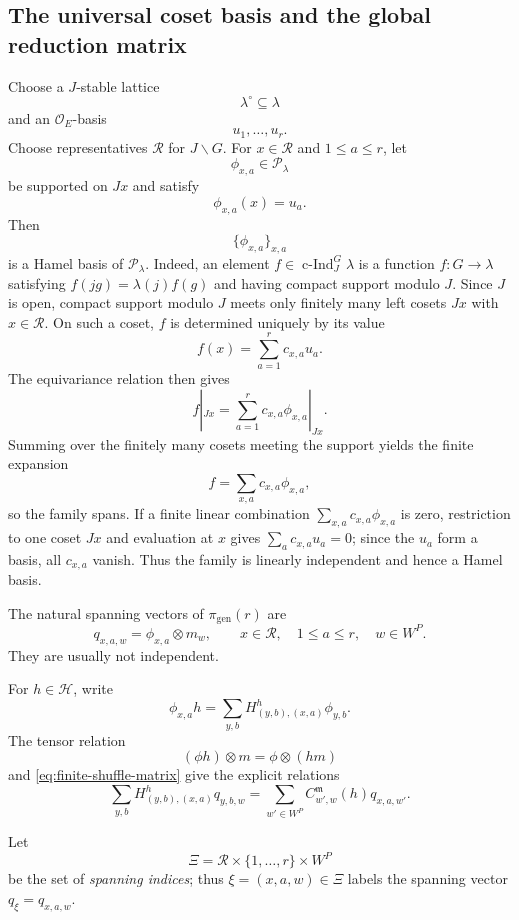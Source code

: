 \documentclass[12pt]{article}
\theoremstyle{definition}
\theoremstyle{remark}
\newcommand{\Ocoeff}{\mathcal O_E}
\newcommand{\cInd}{\operatorname{c\text{-}Ind}}
\begin{document}
\subsection{The universal coset basis and the global reduction matrix}

Choose a \(J\)-stable lattice
\[
 \lambda^\circ\subseteq\lambda
\]
and an \(\Ocoeff\)-basis
\[
 u_1,\ldots,u_r.
\]
Choose representatives \(\mathscr R\) for \(J\backslash G\).  For
\(x\in\mathscr R\) and \(1\leq a\leq r\), let
\[
 \phi_{x,a}\in\mathcal P_\lambda
\]
be supported on \(Jx\) and satisfy
\[
 \phi_{x,a}(x)=u_a.
\]
Then
\[
 \{\phi_{x,a}\}_{x,a}
\]
is a Hamel basis of \(\mathcal P_\lambda\).
Indeed, an element $f\in\cInd_J^G\lambda$ is a function
$f:G\to\lambda$ satisfying $f(jg)=\lambda(j)f(g)$ and having compact
support modulo $J$.  Since $J$ is open, compact support modulo $J$ meets
only finitely many left cosets $Jx$ with $x\in\mathscr R$.  On such a coset,
$f$ is determined uniquely by its value
\[
 f(x)=\sum_{a=1}^r c_{x,a}u_a.
\]
The equivariance relation then gives
\[
 f|_{Jx}=\sum_{a=1}^r c_{x,a}\phi_{x,a}|_{Jx}.
\]
Summing over the finitely many cosets meeting the support yields the finite
expansion
\[
 f=\sum_{x,a}c_{x,a}\phi_{x,a},
\]
so the family spans.  If a finite linear combination
$\sum_{x,a}c_{x,a}\phi_{x,a}$ is zero, restriction to one coset $Jx$ and
evaluation at $x$ gives $\sum_a c_{x,a}u_a=0$; since the $u_a$ form a basis,
all $c_{x,a}$ vanish.  Thus the family is linearly independent and hence a
Hamel basis.

The natural spanning vectors of \(\pi_{\mathrm{gen}}(r)\) are
\begin{equation}\label{eq:q-xaw}
 q_{x,a,w}
 =
 \phi_{x,a}\otimes m_w,
 \qquad
 x\in\mathscr R,\quad
 1\leq a\leq r,\quad
 w\in W^P.
\end{equation}
They are usually not independent.

For \(h\in\mathcal H\), write
\begin{equation}\label{eq:Hecke-on-universal-basis}
 \phi_{x,a}h
 =
 \sum_{y,b}
 H^h_{(y,b),(x,a)}\phi_{y,b}.
\end{equation}
The tensor relation
\[
 (\phi h)\otimes m
 =
 \phi\otimes(hm)
\]
and \eqref{eq:finite-shuffle-matrix} give the explicit relations
\begin{equation}\label{eq:master-reduction-relation}
 \sum_{y,b}
 H^h_{(y,b),(x,a)}
 q_{y,b,w}
 =
 \sum_{w'\in W^P}
 C^{\mathfrak m}_{w',w}(h)
 q_{x,a,w'}.
\end{equation}

Let
\[
 \Xi=\mathscr R\times\{1,\ldots,r\}\times W^P
\]
be the set of \emph{spanning indices}; thus
$\xi=(x,a,w)\in\Xi$ labels the spanning vector $q_\xi=q_{x,a,w}$.
\end{document}
